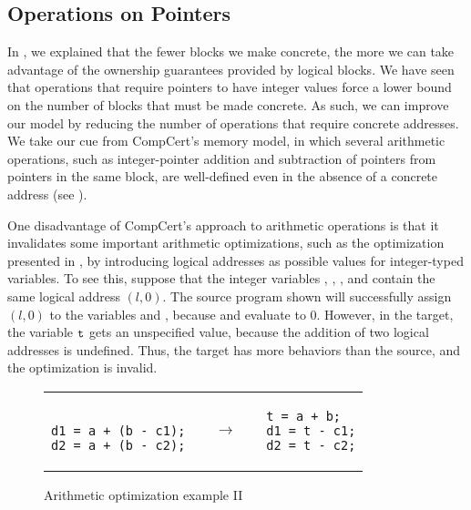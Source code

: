 \subsection{Operations on Pointers}

In , we explained that the fewer blocks we make concrete, the more we can take advantage of the ownership guarantees provided by logical blocks. We have seen that operations that require pointers to have integer values force a lower bound on the number of blocks that must be made concrete. As such, we can improve our model by reducing the number of operations that require concrete addresses. We take our cue from CompCert's memory model, in which several arithmetic operations, such as integer-pointer addition and subtraction of pointers from pointers in the
same block, are well-defined even in the absence of a concrete address (see ). 

One disadvantage of CompCert's approach to arithmetic operations is that it invalidates some important arithmetic optimizations, such as the optimization presented in , by introducing logical addresses as possible values for integer-typed variables. 
To see this, suppose that the integer variables , , , and  contain the same logical address $(l,0)$. The source program shown will successfully assign $(l,0)$ to the variables  and , because  and  evaluate to $0$. However, in the target, the variable $\texttt{t}$ gets an unspecified value, because the addition of two logical addresses is undefined. Thus, the target has more behaviors than the source, and the optimization is invalid.

\begin{figure}[t]
\center
\begin{tabular}{lll}
\begin{minipage}{0.3\textwidth}
\begin{verbatim}

d1 = a + (b - c1);
d2 = a + (b - c2);
\end{verbatim}
\end{minipage}
&
$\quad\rightarrow\quad$
&
\begin{minipage}{0.3\textwidth}
\begin{verbatim}
t = a + b;
d1 = t - c1;
d2 = t - c2;
\end{verbatim}
\end{minipage}
\end{tabular}
\caption{Arithmetic optimization example II}\label{fig:intptrcast:formal-semantics:arith2}
\end{figure}

